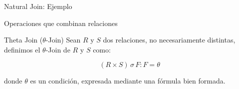 \begin{frame}{Natural Join: Ejemplo}
    \centering

\end{frame}


\begin{frame}{Operaciones que combinan relaciones}
    \begin{block}{Theta Join ($\theta$-Join)}
        Sean $R$ y $S$ dos relaciones, no necesariamente distintas, definimos el
        $\theta$-Join de $R$ y $S$ como:

        $$
            (R \times S)\,\sigma\, F : F = \theta
        $$  

        donde $\theta$ es un condici\'on, expresada
        mediante una f\'ormula bien formada.
        
    \end{block}
\end{frame}
